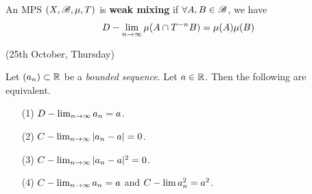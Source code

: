 \documentclass[10pt,a4paper]{report}
\begin{document}
 An MPS $(X,\mathscr{B}, \mu, T)$ is \textbf{weak mixing} if $\forall A,B \in \mathscr{B}$, we have
\begin{align*}
D-\lim_{n\rightarrow \infty} \mu(A \cap T^{-n}B) = \mu(A) \mu(B)
\end{align*}
\s

\newday

(25th October, Thursday)
\s

\lem Let $(a_n) \subset \mathbb{R}$ be a \emph{bounded sequence}. Let $a\in \mathbb{R}$. Then the following are equivalent.
\begin{itemize}
\item[(1)] $D-\lim_{n\rightarrow \infty} a_n =a$.
\item[(2)] $C-\lim_{n\rightarrow \infty} |a_n -a| =0$.
\item[(3)] $C-\lim_{n\rightarrow \infty} |a_n -a|^2 =0$.
\item[(4)] $C-\lim_{n\rightarrow \infty} a_n =a$ and $C-\lim a_n^2 =a^2$.
\end{itemize}
\end{document}
